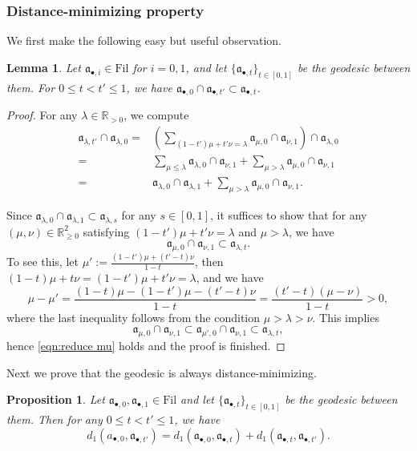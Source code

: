 \documentclass[11pt, leqno]{amsart}%
\theoremstyle{plain}
\newtheorem{lemma}[theorem]{Lemma}
\newtheorem{proposition}[theorem]{Proposition}
\theoremstyle{definition}
\theoremstyle{remark}
\newcommand{\bR}{\mathbb{R}}
\newcommand{\fa}{\mathfrak{a}}
\newcommand{\Fil}{\mathrm{Fil}}
\numberwithin{equation}{section}
\begin{document}
\subsubsection{Distance-minimizing property}

We first make the following easy but useful observation.

\begin{lemma}\label{lem:subinterval}
    Let $\fa_{\bullet,i}\in\Fil$ for $i=0,1$, and let $\{\fa_{\bullet,t}\}_{t\in[0,1]}$ be the geodesic between them. For $0\le t<t'\le 1$, we have $\fa_{\bullet,0}\cap\fa_{\bullet,t'}\subset\fa_{\bullet,t}$. 
\end{lemma}

\begin{proof}
    For any $\lambda\in\bR_{>0}$, we compute
    \begin{align*}
        \fa_{\lambda,t'}\cap\fa_{\lambda,0}=&\left(\sum_{(1-t')\mu+t'\nu=\lambda}\fa_{\mu,0}\cap\fa_{\nu,1}\right)\cap\fa_{\lambda,0}\\
        =&\sum_{\mu\le \lambda}\fa_{\lambda,0}\cap\fa_{\nu,1}+\sum_{\mu>\lambda}\fa_{\mu,0}\cap\fa_{\nu,1}\\
        =&\fa_{\lambda,0}\cap\fa_{\lambda,1}+\sum_{\mu>\lambda}\fa_{\mu,0}\cap\fa_{\nu,1}.
    \end{align*}
	
    Since $\fa_{\lambda,0}\cap\fa_{\lambda,1}\subset\fa_{\lambda,s}$ for any $s\in[0,1]$, it suffices to show that for any $(\mu,\nu)\in\bR_{\ge 0}^2$ satisfying $(1-t')\mu+t'\nu=\lambda$ and $\mu>\lambda$, we have
    \begin{equation}\label{eqn:reduce mu}
        \fa_{\mu,0}\cap\fa_{\nu,1}\subset\fa_{\lambda,t}.
    \end{equation}
    To see this, let $\mu':=\frac{(1-t')\mu+(t'-t)\nu}{1-t}$, then $(1-t)\mu+t\nu=(1-t')\mu+t'\nu=\lambda$, and we have
    \[
        \mu-\mu'=\frac{(1-t)\mu-(1-t')\mu-(t'-t)\nu}{1-t}=\frac{(t'-t)(\mu-\nu)}{1-t}>0,
    \]
    where the last inequality follows from the condition $\mu>\lambda>\nu$. This implies
    \[
        \fa_{\mu,0}\cap\fa_{\nu,1}\subset \fa_{\mu',0}\cap\fa_{\nu,1}\subset \fa_{\lambda,t},
    \]
    hence \eqref{eqn:reduce mu} holds and the proof is finished.
\end{proof}

Next we prove that the geodesic is always distance-minimizing.

\begin{proposition}\label{prop:distance minimizing}
    Let $\fa_{\bullet,0},\fa_{\bullet,1}\in\Fil$ and let $\{\fa_{\bullet,t}\}_{t\in[0,1]}$ be the geodesic between them. Then for any $0\le t<t'\le 1$, we have
    \begin{equation}\label{eqn:distance minimizing}
        d_1(a_{\bullet,0},\fa_{\bullet,t'})=
        d_1(\fa_{\bullet,0},\fa_{\bullet,t})+
        d_1(\fa_{\bullet,t},\fa_{\bullet,t'}).
    \end{equation}
\end{proposition}
\end{document}
